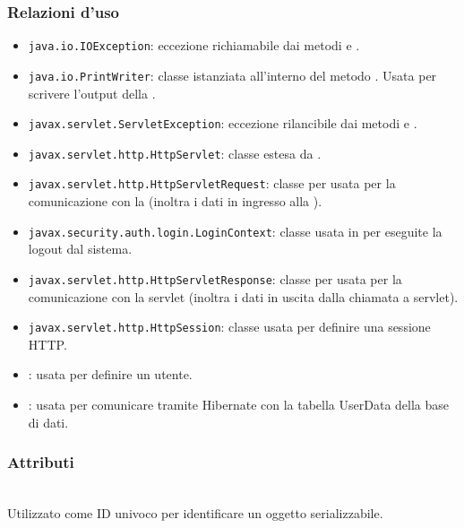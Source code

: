 \subsubsection*{Relazioni d'uso}
\begin{itemize}
	\item \texttt{java.io.IOException}: eccezione richiamabile dai metodi  e .
	\item \texttt{java.io.PrintWriter}: classe istanziata all'interno del metodo . Usata per scrivere l'output della .
	\item \texttt{javax.servlet.ServletException}: eccezione rilancibile dai metodi  e .
	\item \texttt{javax.servlet.http.HttpServlet}: classe estesa da .
	\item \texttt{javax.servlet.http.HttpServletRequest}:  classe per usata per la comunicazione con la  (inoltra i dati in ingresso alla ).
	\item \texttt{javax.security.auth.login.LoginContext}: classe usata in  per eseguite la logout dal sistema.
	\item \texttt{javax.servlet.http.HttpServletResponse}: classe per usata per la comunicazione con la servlet (inoltra i dati in uscita dalla chiamata a servlet).
	\item \texttt{javax.servlet.http.HttpSession}: classe usata per definire una sessione HTTP.
	\item {}: usata per definire un utente.
	\item {}: usata per comunicare tramite Hibernate con la tabella UserData della base di dati.
\end{itemize}

\subsubsection*{Attributi}
\begin{description}
  \item{}\\
  Utilizzato come ID univoco per identificare un oggetto serializzabile.
\end{description}

